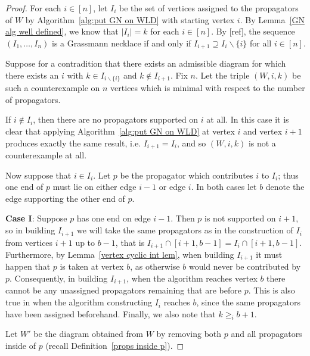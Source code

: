 \documentclass[11pt]{article}
\theoremstyle{remark}
\theoremstyle{definition}
\begin{document}
\begin{proof}
For each $i \in [n]$, let $I_i$ be the set of vertices assigned to the propagators of $W$ by Algorithm~\ref{alg:put GN on WLD} with starting vertex $i$. By Lemma~\ref{GN alg well defined}, we know that $|I_i| = k$ for each $i \in [n]$. By [ref], the sequence $(I_1, \dots, I_n)$ is a Grassmann necklace if and only if $I_{i+1} \supseteq I_i \backslash \{i\}$ for all $i \in [n]$.


Suppose for a contradition that there exists an admissible diagram for which there exists an $i$ with $k\in I_{i\backslash\{i\}}$ and $k \not\in I_{i+1}$.  Fix $n$.  Let the triple $(W, i, k)$ be such a counterexample on $n$ vertices which is minimal with respect to the number of propagators. %

If $i \not\in I_i$, then there are no propagators supported on $i$ at all.  In this case it is clear that applying Algorithm~\ref{alg:put GN on WLD} at vertex $i$ and vertex $i+1$ produces exactly the same result, i.e. $I_{i+1} = I_i$, and so $(W, i, k)$ is not a counterexample at all.

Now suppose that $i \in I_i$.  Let $p$ be the propagator which contributes $i$ to $I_i$; thus one end of $p$ must lie on either edge $i-1$ or edge $i$.  In both cases let $b$ denote the edge supporting the other end of $p$.

\textbf{Case I}:  Suppose $p$ has one end on edge $i-1$.  Then $p$ is not supported on $i+1$, so in building $I_{i+1}$ we will take the same propagators as in the construction of $I_i$ from vertices $i+1$ up to $b-1$, that is $I_{i+1} \cap [i+1,b-1] = I_{i} \cap [i+1,b-1]$.  Furthermore, by Lemma~\ref{vertex cyclic int lem}, when building $I_{i+1}$ it must happen that $p$ is taken at vertex $b$, as otherwise $b$ would never be contributed by $p$.    Consequently, in building $I_{i+1}$, when the algorithm reaches vertex $b$ there cannot be any unassigned propagators remaining that are before $p$.  This is also true in when the algorithm constructing $I_i$ reaches $b$, since the same propagators have been assigned beforehand.  Finally, we also note that $k\geq_i b+1$.

Let $W'$ be the diagram obtained from $W$ by removing both $p$ and all propagators inside of $p$ (recall Definition~\ref{props inside p}).


\end{proof}
\end{document}
